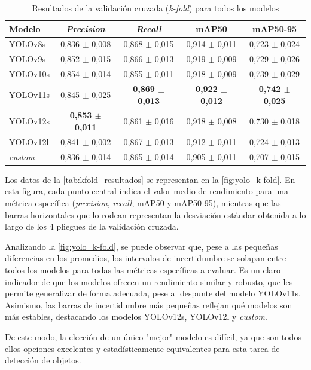 \documentclass[12pt,a4paper,onecolumn,oneside]{report}
\begin{document}
\begin{table}[htbp]
\caption{Resultados de la validación cruzada (\textit{k-fold}) para todos los modelos}
\label{tab:kfold_resultados}
\centering
\begin{tabular}{lcccc}
\toprule
\textbf{Modelo} & \textbf{\textit{Precision}} & \textbf{\textit{Recall}} & \textbf{mAP50} & \textbf{mAP50-95} \\
\midrule
YOLOv8s  & 0,836 $\pm$ 0,008 & 0,868 $\pm$ 0,015 & 0,914 $\pm$ 0,011 & 0,723 $\pm$ 0,024 \\
YOLOv9s  & 0,852 $\pm$ 0,015 & 0,866 $\pm$ 0,013 & 0,919 $\pm$ 0,009 & 0,729 $\pm$ 0,026 \\
YOLOv10s & 0,854 $\pm$ 0,014 & 0,855 $\pm$ 0,011 & 0,918 $\pm$ 0,009 & 0,739 $\pm$ 0,029 \\
YOLOv11s & 0,845 $\pm$ 0,025 & \textbf{0,869 $\pm$ 0,013} & \textbf{0,922 $\pm$ 0,012} & \textbf{0,742 $\pm$ 0,025} \\
YOLOv12s & \textbf{0,853 $\pm$ 0,011} & 0,861 $\pm$ 0,016 & 0,918 $\pm$ 0,008 & 0,730 $\pm$ 0,018 \\
YOLOv12l & 0,841 $\pm$ 0,002 & 0,867 $\pm$ 0,013 & 0,912 $\pm$ 0,011 & 0,724 $\pm$ 0,013 \\
\textit{custom}   & 0,836 $\pm$ 0,014 & 0,865 $\pm$ 0,014 & 0,905 $\pm$ 0,011 & 0,707 $\pm$ 0,015 \\
\bottomrule
\end{tabular}
\end{table}

Los datos de la \autoref{tab:kfold_resultados} se representan en la \autoref{fig:yolo_k-fold}.
En esta figura, cada punto central indica el valor medio de rendimiento para una métrica específica (\textit{precision}, \textit{recall}, mAP50 y mAP50-95), 
mientras que las barras horizontales que lo rodean representan la desviación estándar obtenida a lo largo de los 4 pliegues de la validación cruzada.

Analizando la \autoref{fig:yolo_k-fold}, se puede observar que, pese a las pequeñas diferencias en los promedios, los intervalos de incertidumbre se solapan entre todos los modelos
para todas las métricas específicas a evaluar. Es un claro indicador de que los modelos ofrecen un rendimiento similar y robusto, que les permite generalizar de forma adecuada, pese al despunte del modelo YOLOv11s. 
Asimismo, las barras de incertidumbre más pequeñas reflejan qué modelos son más estables, destacando los modelos YOLOv12s, YOLOv12l y \textit{custom}.

De este modo, la elección de un único "mejor" modelo es difícil, ya que son todos ellos opciones excelentes y estadísticamente equivalentes para esta tarea de detección de objetos. 
\end{document}

